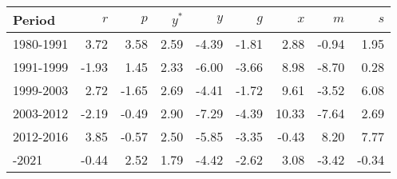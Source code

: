 
\begin{tabular}{lrrrrrrrr}
\toprule
Period & $r$ & $p$ & $y^{*}$ & $y$ & $g$ & $x$ & $m$ & $s$\\
\midrule
1980-1991 & 3.72 & 3.58 & 2.59 & -4.39 & -1.81 & 2.88 & -0.94 & 1.95\\
1991-1999 & -1.93 & 1.45 & 2.33 & -6.00 & -3.66 & 8.98 & -8.70 & 0.28\\
1999-2003 & 2.72 & -1.65 & 2.69 & -4.41 & -1.72 & 9.61 & -3.52 & 6.08\\
2003-2012 & -2.19 & -0.49 & 2.90 & -7.29 & -4.39 & 10.33 & -7.64 & 2.69\\
2012-2016 & 3.85 & -0.57 & 2.50 & -5.85 & -3.35 & -0.43 & 8.20 & 7.77\\
\addlinespace
2016-2021 & -0.44 & 2.52 & 1.79 & -4.42 & -2.62 & 3.08 & -3.42 & -0.34\\
\bottomrule
\end{tabular}
